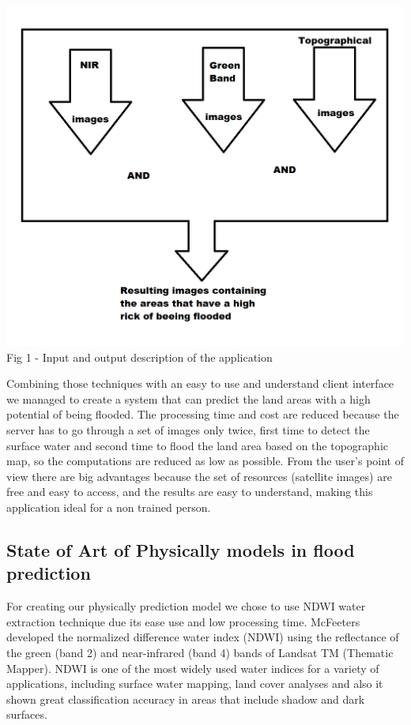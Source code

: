 \documentclass[12pt, a4paper]{report}
\begin{document}
\begin{center}
	\includegraphics[scale=0.6]{application_outline.png} 
	Fig 1 - Input and output description of the application
\end{center}

Combining those techniques with an easy to use and understand client interface we managed to create a system that can predict the land areas with a high potential of being flooded. The processing time and cost are reduced because the server has to go through a set of images only twice, first time to detect the surface water and second time to flood the land area based on the topographic map, so the computations are reduced as low as possible. From the user's point of view there are big advantages because the set of resources (satellite images) are free and easy to access, and the results are easy to understand, making this application ideal for a non trained person.
\par





\subsection{State of Art of Physically models in flood prediction}

\quad
For creating our physically prediction model we chose to use NDWI water extraction technique due its ease use and low processing time. McFeeters \cite{McFeeters} developed the normalized difference water index (NDWI) using the reflectance of the green (band 2) and near-infrared (band 4) bands of Landsat TM (Thematic Mapper). NDWI is one of the most widely used water indices for a variety of applications, including surface water mapping, land cover analyses \cite{Duan, Poulin, Hui} and also it shown great classification accuracy in areas that include shadow and dark surfaces.
\par 
\end{document}
